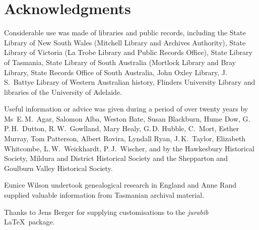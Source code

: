 
\chapter{Acknowledgments}
\label{ch:ack}

Considerable use was made of libraries and public records, including
the State Library of New South Wales (Mitchell Library and Archives
Authority), State Library of Victoria (La Trobe Library and Public
Rec\-ords Office), State Library of Tasmania, State Library of South
Australia (Mortlock Library and Bray Library, State Records Office of
South Australia, John Oxley Library, J.\,S.~Battye Library of Western
Australian history, Flinders University Library and libraries of the
University of Adelaide.

\medskip
Useful information or advice was given during a period of over
twen\-ty years by Ms~E.\,M.~Agar, Salomon Alba, Weston Bate, Susan
Blackburn, Hume Dow, G.\,P.\,H.~Dutton, R.\,W.~Gowlland, Mary Healy,
G.\,D. Hubble, C.~Mort, Esther Murray, Tom Patterson, Albert Rovira,
Lyndall Ryan, J.\,K.~Taylor, Elizabeth Whitcombe, L.\,W.~Weickhardt,
P.\,J.~Wischer, and by the Hawkesbury Historical Society, Mildura and
District Historical Society and the Shepparton and Goulburn Valley
Historical Society.

\medskip
Eunice Wilson undertook genealogical research in England and Anne Rand
supplied valuable information from Tasmanian archival material.

\medskip
Thanks to Jens Berger for supplying customisations to the
\textit{jurabib} \LaTeX\ package.
